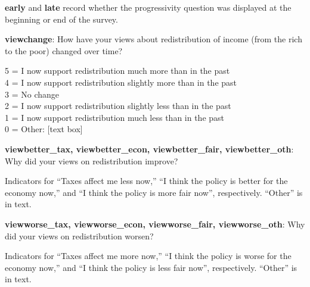 \documentclass[11pt, headsepline]{article}
\begin{document}
\textbf{early} and \textbf{late} record whether the progressivity question was displayed at the beginning or end of the survey.

\textbf{viewchange}: How have your views about redistribution of income (from the rich to the poor) changed over time?

5 = I now support redistribution much more than in the past \\
4 = I now support redistribution slightly more than in the past \\
3 = No change \\
2 = I now support redistribution slightly less than in the past \\
1 = I now support redistribution much less than in the past \\
0 = Other: [text box] 

\textbf{viewbetter\_tax, viewbetter\_econ, viewbetter\_fair, viewbetter\_oth}: Why did your views on redistribution improve?

Indicators for ``Taxes affect me less now,'' ``I think the policy is better for the economy now,'' and ``I think the policy is more fair now'', respectively. ``Other'' is in text.

\textbf{viewworse\_tax, viewworse\_econ, viewworse\_fair, viewworse\_oth}: Why did your views on redistribution worsen?

Indicators for ``Taxes affect me more now,'' ``I think the policy is worse for the economy now,'' and ``I think the policy is less fair now'', respectively. ``Other'' is in text.










\end{document}
